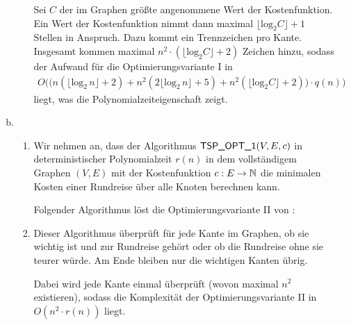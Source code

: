 \begin{enumerate}
\begin{enumerate}[(a)]
\begin{enumerate}[1.]
            Sei $C$ der im Graphen größte angenommene Wert der Kostenfunktion.
            Ein Wert der Kostenfunktion nimmt dann maximal $\lfloor \text{log}_2
            C \rfloor + 1$ Stellen in Anspruch. Dazu kommt ein Trennzeichen pro
            Kante. Insgesamt kommen maximal $n^2 \cdot \left( \lfloor
            \text{log}_2 C \rfloor + 2 \right)$ Zeichen hinzu, sodass der
            Aufwand für die Optimierungsvariante I in
            \begin{align*}
              O\Big(
                \big(
                  n (\lfloor \text{log}_2\, n \rfloor + 2)
                  + n^2 (2 \lfloor \text{log}_2\, n \rfloor + 5)
                  + n^2 \left( \lfloor \text{log}_2 C \rfloor + 2 \right)
                \big) \cdot q(n)
              \Big)
            \end{align*}
            liegt, was die Polynomialzeiteigenschaft zeigt.
        \end{enumerate}

      \item
        \begin{enumerate}[1.]
          \item Wir nehmen an, dass der Algorithmus $\textsf{TSP\_OPT\_1}(V, E, c)$ in
            deterministischer Polynomialzeit $r(n)$ in dem vollständigem Graphen
            $(V, E)$ mit der Kostenfunktion $c: E \rightarrow \mathbb{N}$ die minimalen
            Kosten einer Rundreise über alle Knoten berechnen kann.

            Folgender Algorithmus löst die Optimierungsvariante II von \TSP{}:
            \begin{algorithmic}[1]
                \ENDIF{}
              \ENDWHILE{}
            \end{algorithmic}

          \item Dieser Algorithmus überprüft für jede Kante im Graphen, ob sie
            wichtig ist und zur Rundreise gehört oder ob die Rundreise ohne sie
            teurer würde. Am Ende bleiben nur die wichtigen Kanten übrig.

            Dabei wird jede Kante einmal überprüft (wovon maximal $n^2$
            existieren), sodass die Komplexität der Optimierungsvariante II in
            $O(n^2 \cdot r(n))$ liegt.
        \end{enumerate}
    \end{enumerate}
\end{enumerate}
